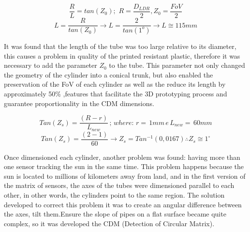 \documentclass[a4paper,12pt]{article}
\begin{document}
$$\frac{R}{L} = tan(Z_{0}) ; \,\,   R = \frac{D_{LDR}}{2}, Z_{0} = \frac{FoV}{2}$$
$$L = \frac{R}{tan(Z_{0})} \longrightarrow L = \frac{2}{tan(1^{o})}  \longrightarrow L \cong 115 mm$$ 


It was found that the length of the tube was too large relative to its diameter, this causes a problem in quality of the printed resistant plastic, therefore it was necessary to add the parameter $Z_{0}$ to the tube. This parameter not only changed the geometry of the cylinder into a conical trunk, but also enabled the preservation of the FoV of each cylinder as well as the reduce its length by approximately 50\% ,features that facilitate the 3D prototyping process and guarantee proportionality in the CDM dimensions.
	

$$Tan(Z_{s}) = \frac{(R-r)}{L_{new}}  \, ; \,  where: \, r= \,1mm \,e \, L_{new}= \, 60mm $$
$$Tan(Z_{s}) = \frac{(2-1)}{60}  \longrightarrow   Z_{s} = Tan^{-1}(0,0167) \therefore Z_{s} \cong 1^{\circ} $$

Once dimensioned each cylinder, another problem was found: having more than one sensor tracking the sun in the same time. This problem happens because the sun is located to millions of kilometers away from land, and in the first version of the matrix of sensors, the axes of the tubes were dimensioned parallel to each other, in other words, the cylinders point to the same region. The solution developed to correct this problem it was to create an angular difference between the axes, tilt them.Ensure the slope of pipes on a flat surface became quite complex, so it was  developed the CDM (Detection of Circular Matrix).
\end{document}
